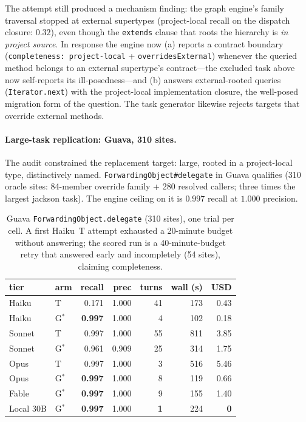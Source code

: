 \documentclass[11pt]{article}
\newcommand{\code}[1]{\texttt{#1}}
\newcommand{\gstar}{G$^{*}$}
\begin{document}
The attempt still produced a mechanism finding: the graph engine's family
traversal stopped at external supertypes (project-local recall on the
dispatch closure: $0.32$), even though the \code{extends} clause that roots
the hierarchy is \emph{in project source}. In response the engine now (a)
reports a contract boundary (\code{completeness: project-local} +
\code{overridesExternal}) whenever the queried method belongs to an external
supertype's contract---the excluded task above now self-reports its
ill-posedness---and (b) answers external-rooted queries
(\code{Iterator.next}) with the project-local implementation closure, the
well-posed migration form of the question. The task generator likewise
rejects targets that override external methods.

\paragraph{Large-task replication: Guava, 310 sites.} The audit constrained
the replacement target: large, rooted in a project-local type,
distinctively named. \code{ForwardingObject\#delegate} in Guava qualifies
(310 oracle sites: 84-member override family + 280 resolved callers; three
times the largest jackson task). The engine ceiling on it is $0.997$ recall
at $1.000$ precision.

\begin{table}[ht]
\centering
\small
\begin{tabular}{llrrrrr}
\toprule
tier & arm & recall & prec & turns & wall (s) & USD \\
\midrule
Haiku  & T        & 0.171 & 1.000 & 41 & 173 & 0.43 \\
Haiku  & \gstar{} & \textbf{0.997} & 1.000 & 4 & 102 & 0.18 \\
Sonnet & T        & 0.997 & 1.000 & 55 & 811 & 3.85 \\
Sonnet & \gstar{} & 0.961 & 0.909 & 25 & 314 & 1.75 \\
Opus   & T        & 0.997 & 1.000 & 3 & 516 & 5.46 \\
Opus   & \gstar{} & \textbf{0.997} & 1.000 & 8 & 119 & 0.66 \\
Fable  & \gstar{} & \textbf{0.997} & 1.000 & 9 & 155 & 1.40 \\
Local 30B & \gstar{} & \textbf{0.997} & 1.000 & \textbf{1} & 224 & \textbf{0} \\
\bottomrule
\end{tabular}
\caption{Guava \code{ForwardingObject.delegate} (310 sites), one trial per
cell. A first Haiku~T attempt exhausted a 20-minute budget without
answering; the scored run is a 40-minute-budget retry that answered early
and incompletely (54 sites), claiming completeness.}
\label{tab:guava}
\end{table}
\end{document}
